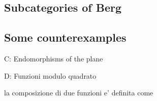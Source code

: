 


\subsection{Subcategories of Berg}



\subsection{Some counterexamples}

C: Endomorphisms of the plane




D: Funzioni modulo quadrato


la composizione di due funzioni e' definita come

  
  

           
           
